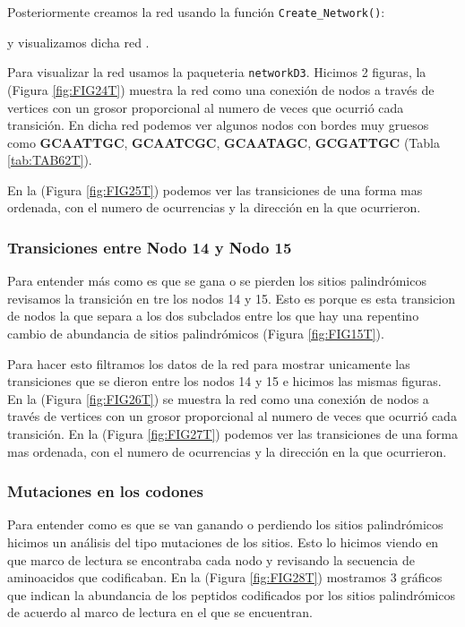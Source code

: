 \documentclass[
]{book}
\begin{document}
Posteriormente creamos la red usando la función \texttt{Create\_Network()}:

y visualizamos dicha red .

Para visualizar la red usamos la paqueteria \texttt{networkD3}. Hicimos 2 figuras, la (Figura \ref{fig:FIG24T}) muestra la red como una conexión de nodos a través de vertices con un grosor proporcional al numero de veces que ocurrió cada transición. En dicha red podemos ver algunos nodos con bordes muy gruesos como \textbf{GCAATTGC}, \textbf{GCAATCGC}, \textbf{GCAATAGC}, \textbf{GCGATTGC} (Tabla \ref{tab:TAB62T}).

En la (Figura \ref{fig:FIG25T}) podemos ver las transiciones de una forma mas ordenada, con el numero de ocurrencias y la dirección en la que ocurrieron.

\hypertarget{transiciones-entre-nodo-14-y-nodo-15-1}{%
\subsubsection{Transiciones entre Nodo 14 y Nodo 15}\label{transiciones-entre-nodo-14-y-nodo-15-1}}

Para entender más como es que se gana o se pierden los sitios palindrómicos revisamos la transición en tre los nodos 14 y 15. Esto es porque es esta transicion de nodos la que separa a los dos subclados entre los que hay una repentino cambio de abundancia de sitios palindrómicos (Figura \ref{fig:FIG15T}).

Para hacer esto filtramos los datos de la red para mostrar unicamente las transiciones que se dieron entre los nodos 14 y 15 e hicimos las mismas figuras.
En la (Figura \ref{fig:FIG26T}) se muestra la red como una conexión de nodos a través de vertices con un grosor proporcional al numero de veces que ocurrió cada transición. En la (Figura \ref{fig:FIG27T}) podemos ver las transiciones de una forma mas ordenada, con el numero de ocurrencias y la dirección en la que ocurrieron.

\hypertarget{mutaciones-en-los-codones-8}{%
\subsubsection{Mutaciones en los codones}\label{mutaciones-en-los-codones-8}}

Para entender como es que se van ganando o perdiendo los sitios palindrómicos hicimos un análisis del tipo mutaciones de los sitios. Esto lo hicimos viendo en que marco de lectura se encontraba cada nodo y revisando la secuencia de aminoacidos que codificaban. En la (Figura \ref{fig:FIG28T}) mostramos 3 gráficos que indican la abundancia de los peptidos codificados por los sitios palindrómicos de acuerdo al marco de lectura en el que se encuentran.
\end{document}
